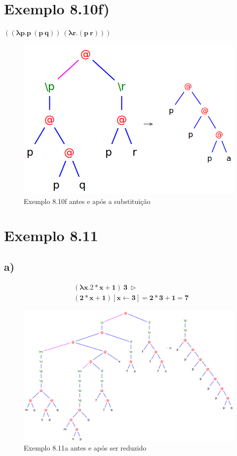 \documentclass[a4paper]{article}
\begin{document}
\FloatBarrier

\section*{Exemplo 8.10f)}

$\mathbf{((\lambda p.p\ (p\ q))\ (\lambda r.(p\ r)))}$

\begin{figure}[h]
  \centering
  \includegraphics[scale=0.5]{8-10f.png}
  \caption{Exemplo 8.10f antes e após a substituição}
\end{figure}

\FloatBarrier

\section*{Exemplo 8.11}
\subsection*{a)}
\begin{align*}
&\mathbf{(\lambda x.2 * x + 1)\ 3\ \rhd} \\
&\mathbf{(2 * x + 1) [x \leftarrow 3] = 2*3 + 1 = 7}
\end{align*}

\begin{figure}[h]
  \centering
  \includegraphics[scale=0.5]{8-11a_1.png}
  \caption{Exemplo 8.11a antes e após ser reduzido}
\end{figure}
\end{document}
